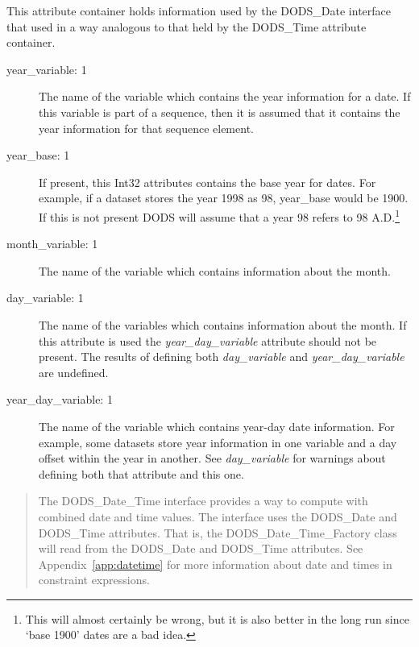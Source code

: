 \documentclass[12pt]{article}
\begin{document}
\begin{description}
\begin{description}
    \end{description}

\item [DODS\_Date: 1] This attribute container holds information used by the
  DODS\_Date interface that used in a way analogous to that held by the
  DODS\_Time attribute container.

  \begin{description}
    
    \item [year\_variable: 1] The name of the variable which contains the
      year information for a date. If this variable is part of a sequence,
      then it is assumed that it contains the year information for that
      sequence element.
      
    \item [year\_base: 1] If present, this Int32 attributes contains the base
      year for dates. For example, if a dataset stores the year 1998 as 98,
      year\_base would be 1900. If this is not present DODS will assume that
      a year 98 refers to 98 A.D.\footnote{This will almost certainly be
        wrong, but it is also better in the long run since `base 1900' dates
        are a bad idea.}

    \item [month\_variable: 1] The name of the variable which contains
      information about the month.

    \item [day\_variable: 1] The name of the variables which contains
      information about the month. If this attribute is used the
      \emph{year\_day\_variable} attribute should not be present. The results
      of defining both \emph{day\_variable} and \emph{year\_day\_variable}
      are undefined.

    \item [year\_day\_variable: 1] The name of the variable which contains
      year-day date information. For example, some datasets store year
      information in one variable and a day offset within the year in
      another. See \emph{day\_variable} for warnings about defining both that
      attribute and this one.

    \end{description}

\begin{quote}
  The DODS\_Date\_Time interface provides a way to compute with combined date
  and time values. The interface uses the DODS\_Date and DODS\_Time
  attributes. That is, the DODS\_Date\_Time\_Factory class will read from the
  DODS\_Date and DODS\_Time attributes. See Appendix~\ref{app:datetime} for
  more information about date and times in constraint expressions.
\end{quote}


\end{description}
\end{document}
